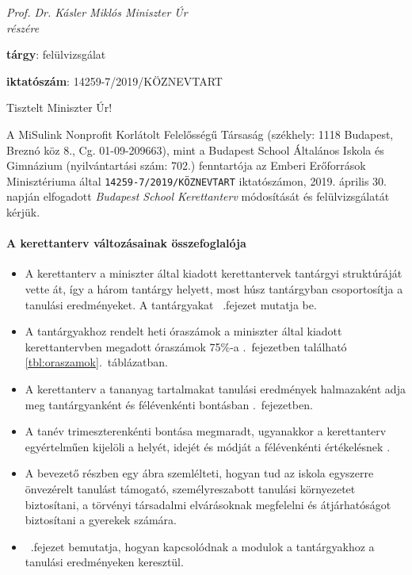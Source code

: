 \pagestyle{empty}

\noindent
\textit{Prof. Dr. Kásler Miklós Miniszter Úr \\
      részére}
\vspace{0.75cm}

\noindent
\textbf{tárgy}: felülvizsgálat

\noindent
\textbf{iktatószám}: 14259-7/2019/KÖZNEVTART
\vspace{0.75cm}

\noindent
Tisztelt Miniszter Úr!
\vspace{0.75cm}

\noindent
A MiSulink Nonprofit Korlátolt Felelősségű Társaság (székhely: 1118 Budapest,
Breznó köz 8., Cg. 01-09-209663), mint a Budapest School Általános Iskola és
Gimnázium (nyilvántartási szám: 702.) fenntartója az Emberi Erőforrások
Minisztériuma által {\tt 14259-7/2019/KÖZNEVTART} iktatószámon, 2019. április 30.
napján
elfogadott \emph{Budapest School Kerettanterv} módosítását és felülvizsgálatát kérjük.


\paragraph{A kerettanterv változásainak összefoglalója}

\begin{itemize}
      \item A kerettanterv a miniszter által kiadott kerettantervek tantárgyi struktúráját vette át, így a három tantárgy helyett, most húsz tantárgyban csoportosítja a tanulási eredményeket. A tantárgyakat ~.fejezet mutatja be.
      \item A tantárgyakhoz rendelt heti óraszámok a miniszter által kiadott kerettantervben megadott óraszámok 75\%-a .~fejezetben található \ref{tbl:oraszamok}.~táblázatban.
      \item A kerettanterv a tananyag tartalmakat tanulási eredmények halmazaként adja meg tantárgyanként és félévenkénti bontásban .~fejezetben.
      \item A tanév trimeszterenkénti bontása megmaradt, ugyanakkor a kerettanterv egyértelműen kijelöli a helyét, idejét és módját a félévenkénti értékelésnek .
      \item A bevezető részben egy ábra szemlélteti, hogyan tud az iskola egyszerre önvezérelt tanulást támogató, személyreszabott tanulási környezetet biztosítani, a törvényi társadalmi elvárásoknak megfelelni és átjárhatóságot biztosítani a gyerekek számára.
      \item {}~.fejezet bemutatja, hogyan kapcsolódnak a modulok a tantárgyakhoz a tanulási eredményeken keresztül.
\end{itemize}


